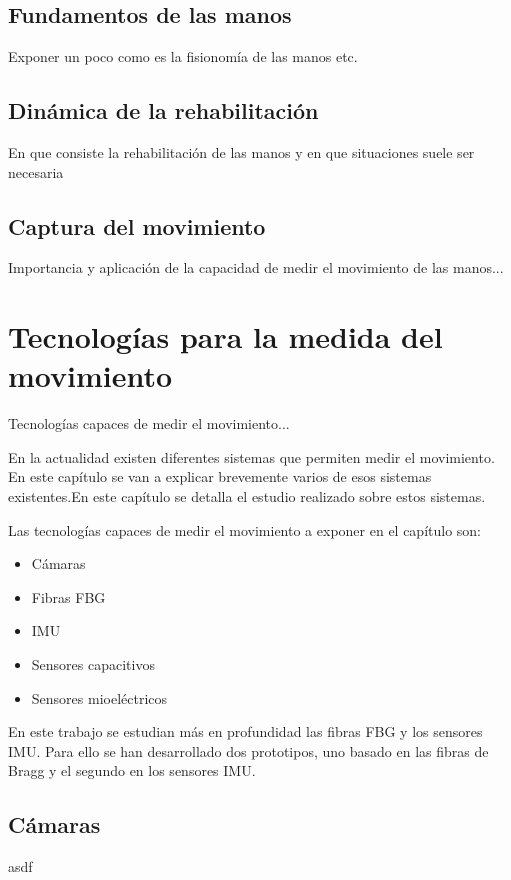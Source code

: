 \subsection{Fundamentos de las manos}
\label{sec:manos2}
Exponer un poco como es la fisionomía de las manos etc.
\subsection{Dinámica de la rehabilitación}
\label{sec:dinamica2}
En que consiste la rehabilitación de las manos y en que situaciones suele ser necesaria\\
\subsection{Captura del movimiento}
\label{sec:captura2}
Importancia y aplicación de la capacidad de medir el movimiento de las manos...

\section{Tecnologías para la medida del movimiento}
\label{sec:tecnologias2}

Tecnologías capaces de medir el movimiento...


En la actualidad existen diferentes sistemas que permiten medir el movimiento. En este capítulo se van a explicar brevemente varios de esos sistemas existentes.En este capítulo se detalla el estudio realizado sobre estos sistemas.


Las tecnologías capaces de medir el movimiento a exponer en el capítulo son:
\begin{itemize}
	\item {Cámaras}
	\item {Fibras FBG}
	\item {IMU}
	\item {Sensores capacitivos}
	\item {Sensores mioeléctricos}
\end{itemize}

En este trabajo se estudian más en profundidad las fibras FBG y los sensores IMU. Para ello se han desarrollado dos prototipos, uno basado en las fibras de Bragg y el segundo en los sensores IMU.

\subsection{Cámaras}
\label{sec:camaras2}
asdf

